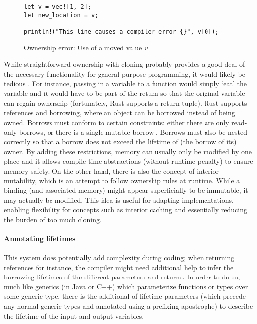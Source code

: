 \begin{figure}[h]
\centering
\begin{verbatim}
let v = vec![1, 2];
let new_location = v;

println!("This line causes a compiler error {}", v[0]);
\end{verbatim}
\caption{Ownership error: Use of a moved value \emph{v}}
\end{figure}

While straightforward ownership with cloning probably provides a good deal of the necessary functionality for general purpose programming, it would likely be tedious \cite{docowner15}. For instance, passing in a variable to a function would simply `eat' the variable and it would have to be part of the return so that the original variable can regain ownership (fortunately, Rust supports a return tuple). Rust supports references and borrowing, where an object can be borrowed instead of being owned. Borrows must conform to certain constraints: either there are only read-only borrows, or there is a single mutable borrow \cite{docborrow15}. Borrows must also be nested correctly so that a borrow does not exceed the lifetime of (the borrow of its) owner. By adding these restrictions, memory can usually only be modified by one place and it allows compile-time abstractions (without runtime penalty) to ensure memory safety. On the other hand, there is also the concept of interior mutability, which is an attempt to follow ownership rules at runtime. While a binding (and associated memory) might appear superficially to be immutable, it may actually be modified. This idea is useful for adapting implementations, enabling flexibility for concepts such as interior caching and essentially reducing the burden of too much cloning.

\paragraph{Annotating lifetimes}
This system does potentially add complexity during coding; when returning references for instance, the compiler might need additional help to infer the borrowing lifetimes of the different parameters and returns. In order to do so, much like generics (in Java or C++) which parameterize functions or types over some generic type, there is the additional of lifetime parameters (which precede any normal generic types and annotated using a prefixing apostrophe) to describe the lifetime of the input and output variables.


